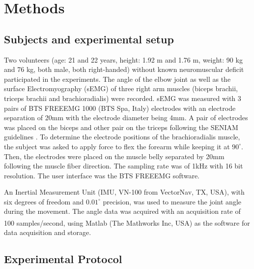 \documentclass[letterpaper, 10 pt, conference]{ieeeconf}  %
\begin{document}
\section{Methods}
\subsection{Subjects and experimental setup}
Two volunteers (age: 21 and 22 years, height: 1.92 m and 1.76 m, weight: 90 kg and 76 kg, both male, both right-handed) without known neuromuscular deficit participated in the experiments. The angle of the elbow joint as well as the surface Electromyography (sEMG) of three right arm muscles (biceps brachii,  triceps brachii and brachioradialis) were recorded. 
sEMG was measured with 3 pairs of BTS FREEEMG 1000 (BTS Spa, Italy) electrodes with an electrode separation of 20mm with the electrode diameter being 4mm. A pair of electrodes was placed on the biceps and other pair on the triceps following the SENIAM guidelines \cite{SENIAM20170110}. To determine the electrode positions of the brachioradialis muscle, the subject was asked to apply force to flex the forearm while keeping it at \(90^{\circ}\). Then, the electrodes were placed on the muscle belly separated by 20mm following the muscle fiber direction. The sampling rate was of 1kHz with 16 bit resolution. The user interface was the BTS FREEEMG software.

An Inertial Measurement Unit (IMU, VN-100 from VectorNav, TX, USA), with six degrees of freedom and \(0.01^{\circ}\) precision, was used to measure the joint angle during the movement. The angle data was acquired with an acquisition rate of 100 samples/second, using Matlab\textsuperscript{\textregistered} (The Mathworks Inc, USA) as the software for data acquisition and storage.


\subsection{Experimental Protocol}
\end{document}
